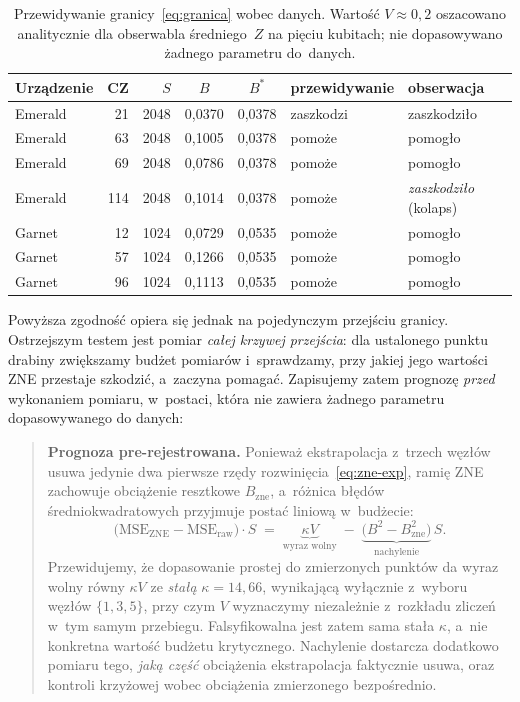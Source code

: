 \documentclass[11pt]{article}
\begin{document}
\begin{table}[!ht]\centering
\caption{Przewidywanie granicy~\eqref{eq:granica} wobec danych. Wartość $V\approx0{,}2$ oszacowano
analitycznie dla obserwabla średniego~$Z$ na pięciu kubitach; nie dopasowywano żadnego parametru
do~danych.}
\label{tab:granica}
\begin{tabular}{lrrccll}
\toprule
Urządzenie & CZ & $S$ & $B$ & $B^{*}$ & przewidywanie & obserwacja \\
\midrule
Emerald & 21 & 2048 & 0{,}0370 & 0{,}0378 & zaszkodzi & zaszkodziło \\
Emerald & 63 & 2048 & 0{,}1005 & 0{,}0378 & pomoże & pomogło \\
Emerald & 69 & 2048 & 0{,}0786 & 0{,}0378 & pomoże & pomogło \\
Emerald & 114 & 2048 & 0{,}1014 & 0{,}0378 & pomoże & \emph{zaszkodziło} (kolaps) \\
Garnet & 12 & 1024 & 0{,}0729 & 0{,}0535 & pomoże & pomogło \\
Garnet & 57 & 1024 & 0{,}1266 & 0{,}0535 & pomoże & pomogło \\
Garnet & 96 & 1024 & 0{,}1113 & 0{,}0535 & pomoże & pomogło \\
\bottomrule
\end{tabular}
\end{table}

Powyższa zgodność opiera się jednak na pojedynczym przejściu granicy. Ostrzejszym testem jest
pomiar \emph{całej krzywej przejścia}: dla ustalonego punktu drabiny zwiększamy budżet pomiarów
i~sprawdzamy, przy jakiej jego wartości ZNE przestaje szkodzić, a~zaczyna pomagać. Zapisujemy zatem
prognozę \emph{przed} wykonaniem pomiaru, w~postaci, która nie zawiera żadnego parametru
dopasowywanego do danych:
\begin{quote}
\textbf{Prognoza pre-rejestrowana.} Ponieważ ekstrapolacja z~trzech węzłów usuwa jedynie dwa
pierwsze rzędy rozwinięcia~\eqref{eq:zne-exp}, ramię ZNE zachowuje obciążenie resztkowe
$B_{\text{zne}}$, a~różnica błędów średniokwadratowych przyjmuje postać liniową w~budżecie:
\begin{equation}
  \bigl(\text{MSE}_{\text{ZNE}} - \text{MSE}_{\text{raw}}\bigr)\cdot S
  \;=\; \underbrace{\kappa V}_{\text{wyraz wolny}}
  \;-\; \underbrace{\bigl(B^2 - B_{\text{zne}}^2\bigr)}_{\text{nachylenie}}\, S .
  \label{eq:kappa-fit}
\end{equation}
Przewidujemy, że dopasowanie prostej do zmierzonych punktów da wyraz wolny równy $\kappa V$ ze
\emph{stałą} $\kappa = 14{,}66$, wynikającą wyłącznie z~wyboru węzłów $\{1,3,5\}$, przy czym $V$
wyznaczymy niezależnie z~rozkładu zliczeń w~tym samym przebiegu. Falsyfikowalna jest zatem sama
stała $\kappa$, a~nie konkretna wartość budżetu krytycznego. Nachylenie dostarcza dodatkowo pomiaru
tego, \emph{jaką część} obciążenia ekstrapolacja faktycznie usuwa, oraz kontroli krzyżowej wobec
obciążenia zmierzonego bezpośrednio.
\end{quote}
\end{document}
